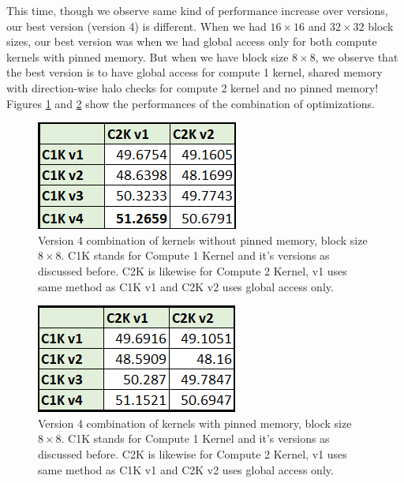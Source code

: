 \documentclass[12pt,reqno]{amsart}
\begin{document}
This time, though we observe same kind of performance increase over versions, our best version (version 4) is different. When we had $16\times16$ and $32\times32$ block sizes, our best version was when we had global access only for both compute kernels with pinned memory. But when we have block size $8\times8$, we observe that the best version is to have global access for compute 1 kernel, shared memory with direction-wise halo checks for compute 2 kernel and no pinned memory!  Figures \ref{fig:v4nopin8} and \ref{fig:v4yepin8} show the performances of the combination of optimizations.
\begin{figure}[h]
\centering
\includegraphics[width=0.45\linewidth]{v4nopin8.png}
\caption{Version 4 combination of kernels without pinned memory, block size $8\times8$. C1K stands for Compute 1 Kernel and it's versions as discussed before. C2K is likewise for Compute 2 Kernel, v1 uses same method as C1K v1 and C2K v2 uses global access only.}
\label{fig:v4nopin8}
\end{figure}

\begin{figure}[h]
\centering
\includegraphics[width=0.45\linewidth]{v4yepin8.png}
\caption{Version 4 combination of kernels with pinned memory, block size $8\times8$. C1K stands for Compute 1 Kernel and it's versions as discussed before. C2K is likewise for Compute 2 Kernel, v1 uses same method as C1K v1 and C2K v2 uses global access only.}
\label{fig:v4yepin8}
\end{figure}
\end{document}
